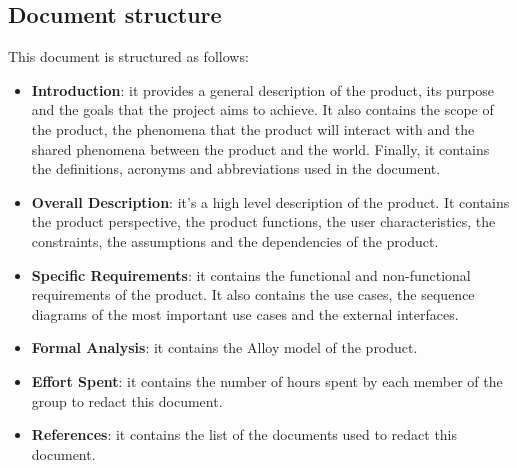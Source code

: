 \subsection{Document structure}
This document is structured as follows:
\begin{itemize}
    \item \textbf{Introduction}: it provides a general description of the product, its purpose and the goals that the project aims to achieve. It also contains the scope of the product, the phenomena that the product will interact with and the shared phenomena between the product and the world. Finally, it contains the definitions, acronyms and abbreviations used in the document.
    \item \textbf{Overall Description}: it's a high level description of the product. It contains the product perspective, the product functions, the user characteristics, the constraints, the assumptions and the dependencies of the product.
    \item \textbf{Specific Requirements}: it contains the functional and non-functional requirements of the product. It also contains the use cases, the sequence diagrams of the most important use cases and the external interfaces.
    \item \textbf{Formal Analysis}: it contains the Alloy model of the product.
    \item \textbf{Effort Spent}: it contains the number of hours spent by each member of the group to redact this document.
    \item \textbf{References}: it contains the list of the documents used to redact this document.
\end{itemize}
